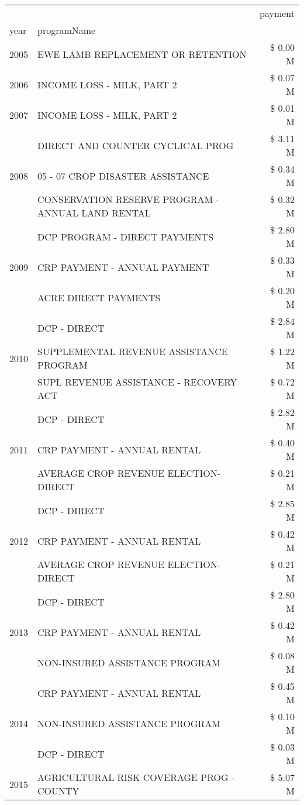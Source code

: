 \begin{tabular}{llr}
\toprule
 &  & payment \\
year & programName &  \\
\midrule
2005 & EWE LAMB REPLACEMENT OR RETENTION & \$ 0.00 M \\
\cline{1-3}
2006 & INCOME LOSS - MILK, PART 2 & \$ 0.07 M \\
\cline{1-3}
2007 & INCOME LOSS - MILK, PART 2 & \$ 0.01 M \\
\cline{1-3}
\multirow[t]{3}{*}{2008} & DIRECT AND COUNTER CYCLICAL PROG & \$ 3.11 M \\
 & 05 - 07 CROP DISASTER ASSISTANCE & \$ 0.34 M \\
 & CONSERVATION RESERVE PROGRAM - ANNUAL LAND RENTAL & \$ 0.32 M \\
\cline{1-3}
\multirow[t]{3}{*}{2009} & DCP PROGRAM - DIRECT PAYMENTS & \$ 2.80 M \\
 & CRP PAYMENT - ANNUAL PAYMENT & \$ 0.33 M \\
 & ACRE DIRECT PAYMENTS & \$ 0.20 M \\
\cline{1-3}
\multirow[t]{3}{*}{2010} & DCP - DIRECT & \$ 2.84 M \\
 & SUPPLEMENTAL REVENUE ASSISTANCE PROGRAM & \$ 1.22 M \\
 & SUPL REVENUE ASSISTANCE - RECOVERY ACT & \$ 0.72 M \\
\cline{1-3}
\multirow[t]{3}{*}{2011} & DCP - DIRECT & \$ 2.82 M \\
 & CRP PAYMENT - ANNUAL RENTAL & \$ 0.40 M \\
 & AVERAGE CROP REVENUE ELECTION-DIRECT & \$ 0.21 M \\
\cline{1-3}
\multirow[t]{3}{*}{2012} & DCP - DIRECT & \$ 2.85 M \\
 & CRP PAYMENT - ANNUAL RENTAL & \$ 0.42 M \\
 & AVERAGE CROP REVENUE ELECTION-DIRECT & \$ 0.21 M \\
\cline{1-3}
\multirow[t]{3}{*}{2013} & DCP - DIRECT & \$ 2.80 M \\
 & CRP PAYMENT - ANNUAL RENTAL & \$ 0.42 M \\
 & NON-INSURED ASSISTANCE PROGRAM & \$ 0.08 M \\
\cline{1-3}
\multirow[t]{3}{*}{2014} & CRP PAYMENT - ANNUAL RENTAL & \$ 0.45 M \\
 & NON-INSURED ASSISTANCE PROGRAM & \$ 0.10 M \\
 & DCP - DIRECT & \$ 0.03 M \\
\cline{1-3}
\multirow[t]{3}{*}{2015} & AGRICULTURAL RISK COVERAGE PROG - COUNTY & \$ 5.07 M \\

\end{tabular}
